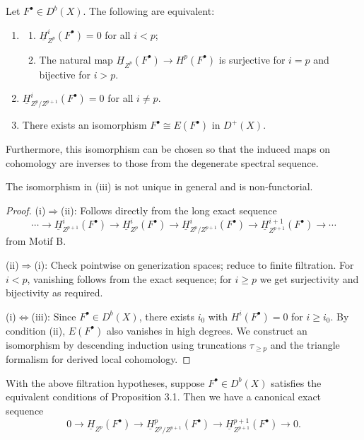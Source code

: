 \setcounter{page}{242}
\begin{proposition}
Let \(F^\bullet\in D^b(X)\). The following are equivalent:
\begin{enumerate}
\item[\textup{(i)}]
\begin{enumerate}
\item[\textup{a)}] \(\underline{H}_{Z^p}^i(F^\bullet)=0\) for all \(i<p\);
\item[\textup{b)}] The natural map \(\underline{H}_{Z^p}(F^\bullet)\to H^p(F^\bullet)\) is surjective for \(i=p\) and bijective for \(i>p\).
\end{enumerate}

\item[\textup{(ii)}] \(\underline{H}_{Z^p/Z^{p+1}}^i(F^\bullet)=0\) for all \(i\ne p\).

\item[\textup{(iii)}] There exists an isomorphism \(F^\bullet\cong E(F^\bullet)\) in \(D^+(X)\).
\end{enumerate}
Furthermore, this isomorphism can be chosen so that the induced maps on cohomology are inverses to those from the degenerate spectral sequence.
\end{proposition}

\begin{remark}
The isomorphism in (iii) is not unique in general and is non-functorial.
\end{remark}

\setcounter{page}{243}
\begin{proof}
\textup{(i)}\(\Rightarrow\)(ii): Follows directly from the long exact sequence
\[
\cdots\to\underline{H}_{Z^{p+1}}^i(F^\bullet)\to\underline{H}_{Z^p}^i(F^\bullet)\to\underline{H}_{Z^p/Z^{p+1}}^i(F^\bullet)\to\underline{H}_{Z^{p+1}}^{i+1}(F^\bullet)\to\cdots
\]
from Motif B.

\textup{(ii)}\(\Rightarrow\)(i): Check pointwise on generization spaces; reduce to finite filtration. For \(i<p\), vanishing follows from the exact sequence; for \(i\ge p\) we get surjectivity and bijectivity as required.

\setcounter{page}{244}
\textup{(i)\(\Leftrightarrow\)(iii)}: Since \(F^\bullet\in D^b(X)\), there exists \(i_0\) with \(H^i(F^\bullet)=0\) for \(i\ge i_0\). By condition (ii), \(E(F^\bullet)\) also vanishes in high degrees. We construct an isomorphism by descending induction using truncations \(\tau_{\ge p}\) and the triangle formalism for derived local cohomology.
\end{proof}

\setcounter{page}{245}
\begin{proposition}
With the above filtration hypotheses, suppose \(F^\bullet\in D^b(X)\) satisfies the equivalent conditions of Proposition 3.1. Then we have a canonical exact sequence
\[
0\to \underline{H}_{Z^p}(F^\bullet)\to \underline{H}_{Z^p/Z^{p+1}}^p(F^\bullet)\to \underline{H}_{Z^{p+1}}^{p+1}(F^\bullet)\to 0.
\]
\end{proposition}